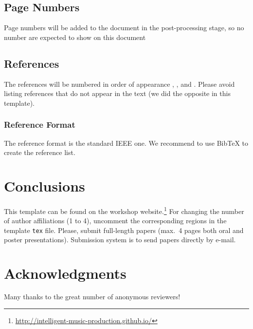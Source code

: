 \documentclass{article}
\begin{document}
\subsection{Page Numbers}
Page numbers will be added to the document in the post-processing stage, so no number are expected to show on this document


\subsection{References}
The references will be numbered in order of appearance \cite{Mitra:Kaiser:1993:DSP:handbook}, \cite{Haykin:1991:adaptive:filter}, \cite{Moorer:2000:AES:audio:millenium} and \cite{Nackaerts:2001:ICMC}. Please avoid listing references that do not appear in the text (we did the opposite in this template).


\subsubsection{Reference Format}
The reference format is the standard IEEE one. We recommend to use BibTeX to create the reference list.


\section{Conclusions}
This template can be found on the workshop website.\footnote{\url{http://intelligent-music-production.github.io/}}
For changing the number of author affiliations (1 to 4), uncomment the corresponding regions in the template \texttt{tex} file.
Please, submit full-length papers (max.~4 pages both oral and poster presentations).
Submission system is to send papers directly by e-mail.

\section{Acknowledgments}
Many thanks to the great number of anonymous reviewers!



{}
\end{document}
